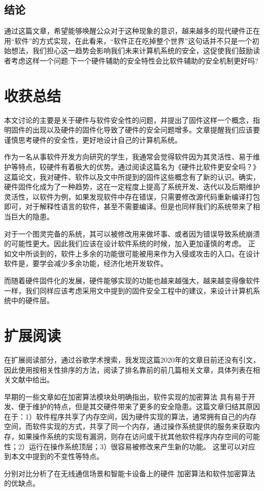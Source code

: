 \subsection{结论}

通过这篇文章，希望能够唤醒公众对于这种现象的意识，越来越多的现代硬件正在用“软件”的方式实现，在此看来，“软件正在吃掉整个世界”这句话并不只是一个初始想法，我们担心这一趋势会影响我们未来计算机系统的安全，这促使我们鼓励读者考虑这样一个问题:下一个硬件辅助的安全特性会比软件辅助的安全机制更好吗?

\section{收获总结}

本文讨论的主要是关于硬件与软件安全性的问题，并提出了固件这样一个概念，指明固件的出现以及硬件的固件化导致了硬件的安全问题增多。文章提醒我们应该要
谨慎思考硬件的安全性，更好地设计自己的计算机系统。

作为一名从事软件开发方向研究的学生，我通常会觉得软件因为其灵活性、易于维护等特点，较硬件有着极大的优势。通过阅读这篇名为《硬件比软件更安全吗？》这篇论文，我对硬件、软件以及文中所提到的固件这些概念有了新的认识。确实，硬件固件化成为了一种趋势，这在一定程度上提高了系统开发、迭代以及后期维护灵活性，以软件为例，如果发现软件中存在错误，只需要修改源代码重新编译打包即可，对于解释性语言的软件，甚至不需要编译。但是也同样我们的系统带来了相当巨大的隐患。

对于一个图灵完备的系统，其可以被修改用来做坏事、或者因为错误导致系统崩溃的可能性更大。因此我们应该在设计软件系统的时候，加入更加谨慎的考虑。
正如文中所谈到的，软件上多余的功能很可能被用来作为入侵或攻击的入口。在设计软件是，要学会减少多余功能，经济化地开发软件。

而随着硬件固件化的发展，硬件能够实现的功能也越来越强大，越来越变得像软件一样，我们同样应该考虑采用文中提到的固件安全工程中的建议，来设计计算机系统中的硬件层。

\section{扩展阅读}

在扩展阅读部分，通过谷歌学术搜索，我发现这篇2020年的文章目前还没有引文，因此使用按相关性排序的方法，阅读了排名靠前的前几篇相关文章，具体列表在相关文献中给出。

早期的一些文章如\cite{bar2002security}在加密算法模块处明确指出，软件实现的加密算法
具有易于开发、便于维护的特点，但是其交硬件带来了更多的安全隐患。这篇文章归结其原因
在于：1）软件程序共享了内存空间，因为硬件实现的算法，通常拥有自己的内存空间，而软件实现的方式，共享了同一个内存，通过操作系统提供的服务来获取内存，如果操作系统的实现有漏洞，则存在访问或干扰其他软件程序内存空间的可能性；2）运行在操作系统顶层；3）很容易被修改来产生新的功能。
这里可以对应到本文中提到的不变性等特点。

\cite{dhem2001hardware,healy2008analysis}分别对比分析了在无线通信场景和智能卡设备上的硬件
加密算法和软件加密算法的优缺点。

\nocite{*}

